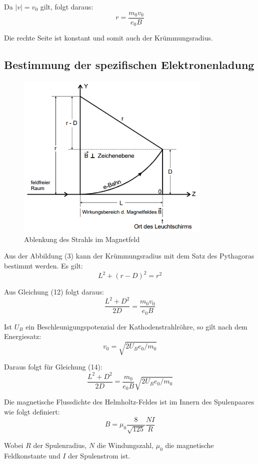 Da $|v| = v_0$ gilt, folgt daraus:
\begin{equation}
  r = \frac{m_0 v_0}{e_0 B}
\end{equation}

Die rechte Seite ist konstant und somit auch der Krümmungsradius.


\subsection{Bestimmung der spezifischen Elektronenladung}

\begin{figure}[H]
  \centering
  \includegraphics[height=8cm]{ablenkungbfeld.PNG}
  \caption{Ablenkung des Strahls im Magnetfeld}
  \label{fig:ablenkungbfeld}
\end{figure}

Aus der Abbildung (3) kann der Krümmungsradius mit dem Satz des Pythagoras bestimmt werden.
Es gilt:
\begin{equation}
  L^2 + (r - D)^2 = r^2
\end{equation}

Aus Gleichung (12) folgt daraus:
\begin{equation}
  \frac{L^2 + D^2}{2D} = \frac{m_0 v_0}{e_0 B}
\end{equation}

Ist $U_B$ ein Beschleunigungspotenzial der Kathodenstrahlröhre, so gilt nach dem Energiesatz:
\begin{equation}
  v_0 = \sqrt{2U_B e_0/m_0}
\end{equation}

Daraus folgt für Gleichung (14):
\begin{equation}
  \frac{L^2 + D^2}{2D} = \frac{m_0}{e_0 B} \sqrt{2U_B e_0/m_0}
\end{equation}

Die magnetische Flussdichte des Helmholtz-Feldes ist im Innern des Spulenpaares wie folgt definiert:
\begin{equation}
  B = \mu_0 \frac{8}{\sqrt{125}} \frac{NI}{R}
\end{equation}

Wobei $R$ der Spulenradius, $N$ die Windungszahl, $\mu_0$ die magnetische Feldkonstante und
$I$ der Spulenstrom ist.
